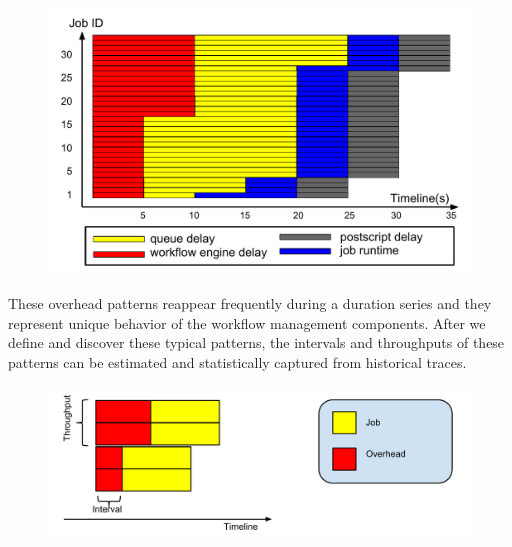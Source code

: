 \begin{figure}[htb]
\centering
 \includegraphics[width=1\linewidth]{figures/sensitivity/trace.pdf}
  \label{fig:sensitivity_trace}
\end{figure}


These overhead patterns reappear frequently during a duration series and they represent unique behavior of the workflow management components. After we define and discover these typical patterns, the intervals and throughputs of these patterns can be estimated and statistically captured from historical traces. 


\begin{figure}[htb]
\centering
 \includegraphics[width=1\linewidth]{figures/sensitivity/incremental.pdf}
  \label{fig:sensitivity_ipp}
\end{figure}

